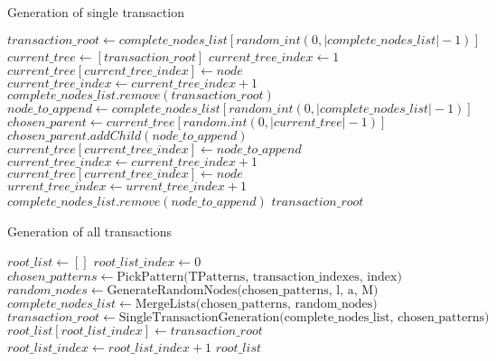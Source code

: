 \documentclass{acm_proc_article-sp-sigmod09}
\begin{document}
\begin{algorithm}
\caption{Generation of single transaction}
\label{transaction_generation}
\begin{algorithmic}[1]
\State $transaction\_root \gets complete\_nodes\_list[random\_int(0, |complete\_nodes\_list| - 1)]$
\State $current\_tree \gets [transaction\_root]$
\State $current\_tree\_index \gets 1$
        \State $current\_tree[current\_tree\_index] \gets node$
        \State $current\_tree\_index \gets current\_tree\_index + 1$
    \EndFor
\EndIf
\State $complete\_nodes\_list.remove(transaction\_root)$
    \State $node\_to\_append \gets complete\_nodes\_list[random\_int(0, |complete\_nodes\_list| - 1)]$
    \State $chosen\_parent \gets current\_tree[random.int(0, |current\_tree| - 1)]$
    \State $chosen\_parent.addChild(node\_to\_append)$
    \State $current\_tree[current\_tree\_index] \gets node\_to\_append$
    \State $current\_tree\_index \gets current\_tree\_index + 1$
            \State $current\_tree[current\_tree\_index] \gets node$
            \State $urrent\_tree\_index \gets urrent\_tree\_index + 1$
        \EndFor
    \EndIf
    \State $complete\_nodes\_list.remove(node\_to\_append)$
\EndFor
\Return $transaction\_root$
\EndFunction
\end{algorithmic}
\end{algorithm}

\begin{algorithm}
\caption{Generation of all transactions}
\label{complete_transaction_generation}
\begin{algorithmic}[1]
\State $root\_list \gets []$
\State $root\_list\_index \gets 0$
    \State $chosen\_patterns \gets \text{PickPattern(TPatterns, transaction\_indexes, index)}$
    \State $random\_nodes \gets \text{GenerateRandomNodes(chosen\_patterns, l, a, M)}$
    \State $complete\_nodes\_list \gets \text{MergeLists(chosen\_patterns, random\_nodes)}$
    \State $transaction\_root \gets \text{SingleTransactionGeneration(complete\_nodes\_list, chosen\_patterns)}$
    \State $root\_list[root\_list\_index] \gets transaction\_root$
    \State $root\_list\_index \gets root\_list\_index + 1$
\EndFor
\Return $root\_list$
\EndFunction
\end{algorithmic}
\end{algorithm}
\end{document}
